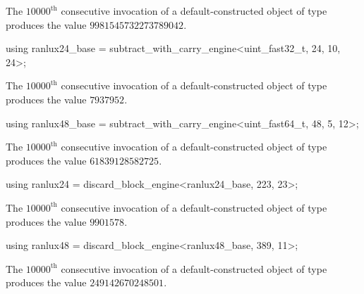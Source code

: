 \begin{itemdescr}
\pnum
\required
 The $10000^\text{th}$ consecutive invocation
 of a default-constructed object
 of type 
 produces the value $9981545732273789042$.
\end{itemdescr}

%
%
\begin{itemdecl}
using ranlux24_base =
      subtract_with_carry_engine<uint_fast32_t, 24, 10, 24>;
\end{itemdecl}

\begin{itemdescr}
\pnum
\required
 The $10000^\text{th}$ consecutive invocation
 of a default-constructed object
 of type 
 produces the value
 $7937952$.
\end{itemdescr}

%
%
\begin{itemdecl}
using ranlux48_base =
      subtract_with_carry_engine<uint_fast64_t, 48, 5, 12>;
\end{itemdecl}

\begin{itemdescr}
\pnum
\required
 The $10000^\text{th}$ consecutive invocation
 of a default-constructed object
 of type 
 produces the value
 $61839128582725$.
\end{itemdescr}

%
%
\begin{itemdecl}
using ranlux24 = discard_block_engine<ranlux24_base, 223, 23>;
\end{itemdecl}

\begin{itemdescr}
\pnum
\required
 The $10000^\text{th}$ consecutive invocation
 of a default-constructed object
 of type 
 produces the value
 $9901578$.
\end{itemdescr}

%
%
\begin{itemdecl}
using ranlux48 = discard_block_engine<ranlux48_base, 389, 11>;
\end{itemdecl}

\begin{itemdescr}
\pnum
\required
 The $10000^\text{th}$ consecutive invocation
 of a default-constructed object
 of type 
 produces the value
 $249142670248501$.
\end{itemdescr}

